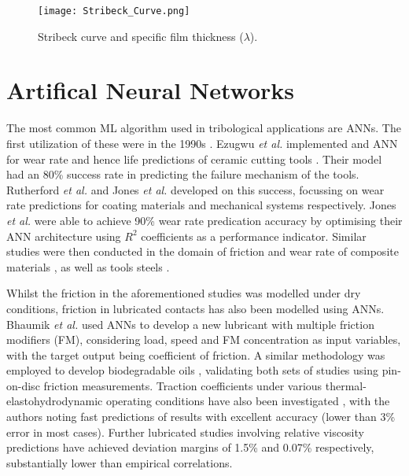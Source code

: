 \begin{figure}
	\centerline{\texttt{[image: Stribeck\_Curve.png]}}
	\caption[Stribeck curve and specific film thickness values.]{Stribeck curve and specific film thickness ($\lambda$). \cite{Ali2015}}
	\label{Stribeck_Curve}
\end{figure}

\section{Artifical Neural Networks}

The most common ML algorithm used in tribological applications are ANNs. The first utilization of these were in the 1990s \cite{Argatov2019}. Ezugwu \textit{et al.} implemented and ANN for wear rate and hence life predictions of ceramic cutting tools \cite{Ezugwu1995}. Their model had an 80\% success rate in predicting the failure mechanism of the tools. Rutherford \textit{et al.} \cite{Rutherford1996} and Jones \textit{et al.} \cite{Jones1997} developed on this success, focussing on wear rate predictions for coating materials and mechanical systems respectively. Jones \textit{et al.} were able to achieve 90\% wear rate predication accuracy by optimising their ANN architecture using $R^2$ coefficients as a performance indicator. Similar studies were then conducted in the domain of friction and wear rate of composite materials \cite{Genel2003} \cite{Hayajneh2009} \cite{Zhang2002}, as well as tools steels \cite{Cavaleri2019}. 

Whilst the friction in the aforementioned studies was modelled under dry conditions, friction in lubricated contacts has also been modelled using ANNs. Bhaumik \textit{et al.} \cite{Bhaumik2019a} used ANNs to develop a new lubricant with multiple friction modifiers (FM), considering load, speed and FM concentration as input variables, with the target output being coefficient of friction. A similar methodology was employed to develop biodegradable oils \cite{Bhaumik2019a}, validating both sets of studies using pin-on-disc friction measurements. Traction coefficients under various thermal-elastohydrodynamic operating conditions have also been investigated \cite{EchavarriOtero2014}, with the authors noting fast predictions of results with excellent accuracy (lower than 3\% error in most cases). Further lubricated studies involving relative viscosity predictions \cite{Afrand2016} \cite{HemmatEsfe2018} have achieved deviation margins of 1.5\% and 0.07\% respectively, substantially lower than empirical correlations.

